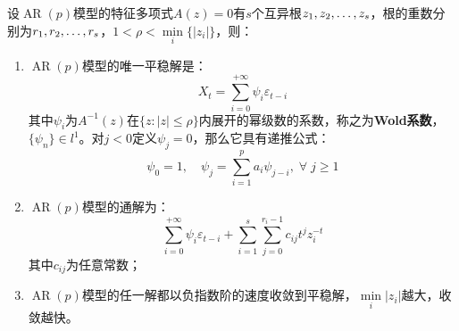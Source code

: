 \begin{theorem}\label{theo:ARPSolution}
	设$\operatorname{AR}(p)$模型的特征多项式$A(z)=0$有$s$个互异根$z_1, z_2, \dots, z_{s}$，根的重数分别为$r_1, r_2, \dots, r_{s}$，$1<\rho<\min\limits_i\{|z_i|\}$，则：
	\begin{enumerate}
		\item $\operatorname{AR}(p)$模型的唯一平稳解是：
		\begin{equation*}
			X_t=\sum_{i=0}^{+\infty}\psi_i\varepsilon_{t-i}
		\end{equation*}
		其中$\psi_i$为$A^{-1}(z)$在$\{z:|z|\leqslant\rho\}$内展开的幂级数的系数，称之为\textbf{Wold系数}，$\{\psi_n\}\in l^1$。对$j<0$定义$\psi_j=0$，那么它具有递推公式：
		\begin{equation*}
			\psi_0=1,\quad\psi_j=\sum_{i=1}^{p}a_i\psi_{j-i},\;\forall\;j\geqslant1
		\end{equation*}
		\item $\operatorname{AR}(p)$模型的通解为：
		\begin{equation*}
			\sum_{i=0}^{+\infty}\psi_i\varepsilon_{t-i}+\sum_{i=1}^{s}\sum_{j=0}^{r_i-1}c_{ij}t^{j}z_i^{-t}
		\end{equation*}
		其中$c_{ij}$为任意常数；
		\item $\operatorname{AR}(p)$模型的任一解都以负指数阶的速度收敛到平稳解，$\min\limits_i{|z_i|}$越大，收敛越快。
	\end{enumerate}
\end{theorem}
